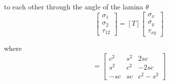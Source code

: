 \documentclass{article}
\begin{document}
to each other through the angle of the lamina $\theta $
\begin{equation}\left[\begin{array}{l}\sigma _{1} \\ \sigma _{2} \\ \tau_{12}\end{array}\right]=[T]\left[\begin{array}{l}\sigma _{x} \\ \sigma _{y} \\\tau_{xy}\end{array}\right]
\end{equation}

where
\begin{equation}[T]=\left[\begin{array}{ccc}c^{2} & s^{2} & 2 s c \\ s^{2} & c^{2} & -2 s c \\ -s c & s c &c^{2}-s^{2}\end{array}\right] 
\end{equation}
\end{document}
